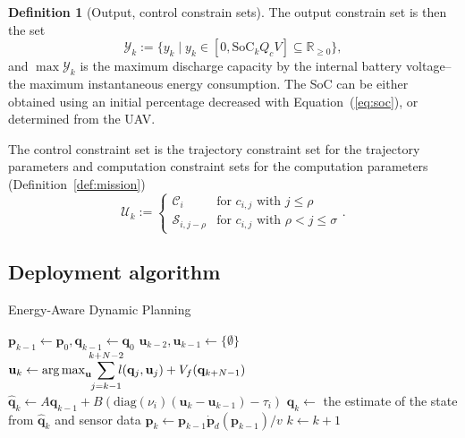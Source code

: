 \documentclass[letterpaper,10pt,conference]{ieeeconf}
\theoremstyle{definition}
\newtheorem{defn}{Definition}[section]
\DeclareMathOperator*{\argmax}{arg\,max}
\begin{document}
\begin{defn}[Output, control constrain sets]
The output constrain set is then the set
\begin{equation*}
  \mathcal{Y}_k:=\{y_k\mid y_k\in[0,\mathrm{SoC}_kQ_cV]\subseteq{\mathbb{R}_{\geq 0}}\},
\end{equation*}
and $\max{\mathcal{Y}}_k$ is the maximum discharge capacity by the internal battery voltage--the maximum instantaneous energy consumption. The SoC can be either obtained using an initial percentage decreased with Equation~(\ref{eq:soc}), or determined from the UAV.

The control constraint set is the trajectory constraint set for the trajectory parameters and computation constraint sets for the computation parameters (Definition~\ref{def:mission})
\begin{equation*}
  \mathcal{U}_k:=\begin{cases}
    \mathcal{C}_i & \text{for } c_{i,j} \text{ with } j\leq\rho\\
    \mathcal{S}_{i,j-\rho} & \text{for } c_{i,j} \text{ with } \rho<j\leq\sigma
  \end{cases}.
\end{equation*}
\end{defn}

\subsection{Deployment algorithm}

\begin{algorithm}[t]
  \caption{Energy-Aware Dynamic Planning}\label{alg}
  \begin{algorithmic}[1]
    \STATE $\mathbf{p}_{k-1}\gets \mathbf{p}_0, \mathbf{q}_{k-1}\gets \mathbf{q}_0$
    \STATE $\mathbf{u}_{k-2},\mathbf{u}_{k-1}\gets \{\emptyset\}$\label{alg:init}
    \label{alg:stages-loop}
        \STATE $\mathbf{u}_k\gets\argmax_{\mathbf{u}}\hspace*{-1ex}{\displaystyle{\sum\limits_{j=k-1}^{k+N-2}}\hspace*{-1ex}{l(\mathbf{q}_j,\mathbf{u}_j)+V_f(\mathbf{q}_{k+N-1})}}$\label{alg:mpc}
        \STATE $\hat{\mathbf{q}}_{k}\gets A\mathbf{q}_{k-1}+B(\mathrm{diag}(\nu_i)(\mathbf{u}_k-\mathbf{u}_{k-1})-\tau_i)$\label{alg:evolution}
        \STATE $\mathbf{q}_{k}\gets$ the estimate of the state from $\hat{\mathbf{q}}_{k}$ and sensor data\label{alg:kalman_end}
        \STATE $\mathbf{p}_{k}\gets\mathbf{p}_{k-1}\dot{\mathbf{p}}_d(\mathbf{p}_{k-1})/v$ \label{alg:pos}
        \STATE $k\gets k+1$
      \ENDWHILE
    \ENDFOR
  \end{algorithmic} 
\end{algorithm}
\end{document}

